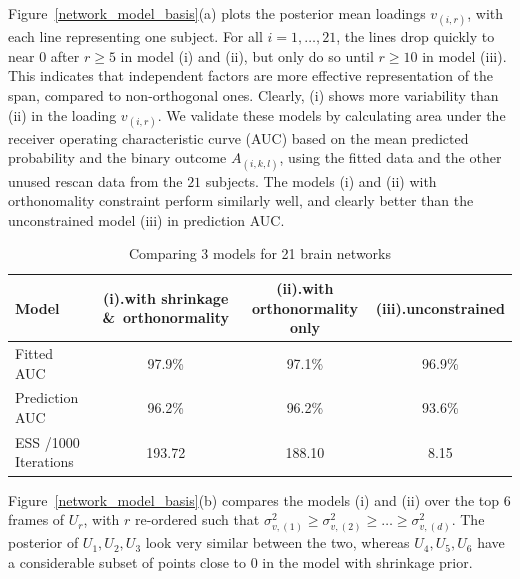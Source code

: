 \documentclass[10pt,fleqn]{article} \pdfoutput=1
\DeclareMathOperator{\1}{\mathbbm{1}} \DeclareMathOperator{\bigO}{\mc O}
\begin{document}
Figure~\ref{network_model_basis}(a) plots the posterior mean loadings
$v_{(i,r) }$, with each line representing one subject. For all
$i=1,\ldots,21$, the lines drop quickly to near $0$ after $r\ge 5$ in
model (i) and (ii), but only do so until $r\ge 10$ in model (iii). This
indicates that independent factors are more effective  representation of
the span, compared to non-orthogonal ones. Clearly, (i) shows more
variability than (ii) in the loading $v_{(i,r)}$. We validate these models
by calculating area under the receiver operating characteristic curve
(AUC) based on the mean predicted probability and the binary outcome
$A_{(i,k,l)}$, using the fitted data and the other unused rescan data from
the $21$ subjects.  The models (i) and (ii) with orthonomality constraint
perform similarly well, and clearly better than the unconstrained model
(iii) in prediction AUC.  \begin{table}[H] \begin{center} \tiny
		\begin{tabular}{ l| c | c| c } \hline     Model & (i).with
			shrinkage \&\ orthonormality     & (ii).with  orthonormality
			only                             & (iii).unconstrained                         \\         \hline
			Fitted AUC                       & 97.9\%                    & 97.1\% & 96.9\% \\ \hline
			Prediction AUC                   & 96.2\%                    & 96.2\% & 93.6\% \\ \hline ESS /1000
			Iterations                       & 193.72                    & 188.10 & 8.15   \\ \hline\end{tabular}
	\end{center} \caption{Comparing 3 models for 21 brain networks
		\label{network_model}} \end{table}

Figure~\ref{network_model_basis}(b) compares the models (i) and (ii) over
the top $6$ frames of $U_r$, with  $r$ re-ordered such that
$\sigma^2_{v,(1)}\ge \sigma^2_{v,(2)}\ge \ldots \ge \sigma^2_{v,(d)}$. The
posterior of $U_1,U_2,U_3$ look very similar between the two, whereas
$U_4,U_5,U_6$ have a considerable subset of points close to 0 in the model
with shrinkage prior.
\end{document}
